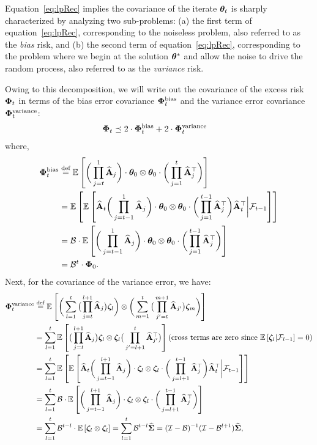 Equation~\ref{eq:lpRec} implies the covariance of the iterate $\boldsymbol{\theta}_t$ is sharply characterized by analyzing two sub-problems: (a) the first term of equation~\ref{eq:lpRec}, corresponding to the noiseless problem, also referred to as the {\em bias} risk, and (b) the second term of equation~\ref{eq:lpRec}, corresponding to the problem where we begin at the solution $\boldsymbol{\theta}^*$ and allow the noise to drive the random process, also referred to as the {\em variance} risk.

Owing to this decomposition, we will write out the covariance of the excess risk $\boldsymbol{\Phi}_t$ in terms of the bias error covariance $\boldsymbol{\Phi}_t^{\text{bias}}$ and the variance error covariance $\boldsymbol{\Phi}_t^{\text{variance}}$:
\begin{align}
\label{eq:bvdecomp}
\boldsymbol{\Phi}_t &\preceq 2\cdot\boldsymbol{\Phi}_t^{\text{bias}} + 2\cdot\boldsymbol{\Phi}_t^{\text{variance}}
\end{align}
where,
\begin{align}
\label{eq:biasLP}
\boldsymbol{\Phi}_t^{\text{bias}}&\stackrel{\textrm{def}}{=} \mathbb{E}\left[\bigg(\prod_{j=t}^{1}\widehat{\mathbf{A}}_j\bigg)\cdot\boldsymbol{\theta}_0\otimes\boldsymbol{\theta}_0\cdot\bigg(\prod_{j=1}^{t}\widehat{\mathbf{A}}_j^{\top}\bigg)\right]\nonumber\\
&=\mathbb{E}\left[\mathbb{E}\left[\widehat{\mathbf{A}}_t\bigg(\prod_{j=t-1}^{1}\widehat{\mathbf{A}}_j\bigg)\cdot\boldsymbol{\theta}_0\otimes\boldsymbol{\theta}_0\cdot\bigg(\prod_{j=1}^{t-1}\widehat{\mathbf{A}}_j^{\top}\bigg)\widehat{\mathbf{A}}_t^{\top}\bigg{\vert}\mathcal{F}_{t-1}\right]\right]\nonumber\\
&=\mathcal{B}\cdot\mathbb{E}\left[\bigg(\prod_{j=t-1}^{1}\widehat{\mathbf{A}}_j\bigg)\cdot\boldsymbol{\theta}_0\otimes\boldsymbol{\theta}_0\cdot\bigg(\prod_{j=1}^{t-1}\widehat{\mathbf{A}}_j^{\top}\bigg)\right]\nonumber\\
&=\mathcal{B}^t\cdot\boldsymbol{\Phi}_0.
\end{align}
Next, for the covariance of the variance error, we have:
\begin{align}
\label{eq:varianceLP}
\boldsymbol{\Phi}_t^{\text{variance}}&\stackrel{\textrm{def}}{=} \mathbb{E}\left[\bigg(\sum_{l=1}^t\big(\prod_{j=t}^{l+1}\widehat{\mathbf{A}}_j\big)\boldsymbol{\zeta}_l\bigg)\otimes\bigg(\sum_{m=1}^t\big(\prod_{j'=t}^{m+1}\widehat{\mathbf{A}}_{j'}\big)\boldsymbol{\zeta}_m\bigg)\right]\nonumber\\
&=\sum_{l=1}^t\mathbb{E}\left[\big(\prod_{j=t}^{l+1}\widehat{\mathbf{A}}_j\big)\boldsymbol{\zeta}_l\otimes\boldsymbol{\zeta}_l\big(\prod_{j'=l+1}^{t}\widehat{\mathbf{A}}_{j'}^{\top}\big)\right] \left(\mbox{cross terms are zero since } \mathbb{E}\left[\boldsymbol{\zeta}_l\middle \vert \mathcal{F}_{l-1}\right] = 0\right)\nonumber\\
&=\sum_{l=1}^t\mathbb{E}\left[\mathbb{E}\left[\widehat{\mathbf{A}}_t\bigg(\prod_{j=t-1}^{l+1}\widehat{\mathbf{A}}_j\bigg)\cdot\boldsymbol{\zeta}_l\otimes\boldsymbol{\zeta}_l\cdot\bigg(\prod_{j=l+1}^{t-1}\widehat{\mathbf{A}}_j^{\top}\bigg)\widehat{\mathbf{A}}_t^{\top}\bigg{\vert}\mathcal{F}_{t-1}\right]\right]\nonumber\\
&=\sum_{l=1}^t\mathcal{B}\cdot\mathbb{E}\left[\bigg(\prod_{j=t-1}^{l+1}\widehat{\mathbf{A}}_j\bigg)\cdot\boldsymbol{\zeta}_l\otimes\boldsymbol{\zeta}_l\cdot\bigg(\prod_{j=l+1}^{t-1}\widehat{\mathbf{A}}_j^{\top}\bigg)\right]\nonumber\\
&=\sum_{l=1}^t\mathcal{B}^{t-l}\cdot\mathbb{E}\left[\boldsymbol{\zeta}_l\otimes\boldsymbol{\zeta}_l\right]=\sum_{l=1}^t\mathcal{B}^{t-l}\mathbf{\widehat{\Sigma}}=(\mathcal{I}-\mathcal{B})^{-1}(\mathcal{I}-\mathcal{B}^{l+1})\mathbf{\widehat{\Sigma}},
\end{align}

